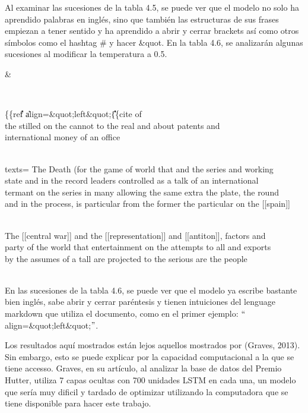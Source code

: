 \vspace{1em}

Al examinar las sucesiones de la tabla 4.5, se puede ver que el modelo no solo ha aprendido palabras en inglés, sino que también las estructuras de sus frases empiezan a tener sentido y ha aprendido a abrir y cerrar brackets así como otros símbolos como el hashtag # y hacer \&quot. En la tabla 4.6, se analizarán algunas sucesiones al modificar la temperatura a 0.5.


\begin{table}[htbp]
\begin{center}
\begin{tabular}{&}

\\ \hline

\{\{ref\| \| \|\| \|\| \|\- \| \| align=\&quot;left\&quot;\|\| \|\| \|\| \|\| \|\| \|\| \|\| \{\{cite of \\ the stilled on the cannot to the real and about patents and \\ international money of an office
\\ 
\\ \hline

texts= The Death (for the game of world that and the series and working \\ state and in the record leaders controlled as a talk of an international \\ termant on the series in many allowing the same extra the plate, the round \\ and in the process, is particular from the former the particular on the [[spain]]
\\ 
\\ \hline

The [[central war]] and the [[representation]] and [[antiton]], factors and \\ party of the world that entertainment on the attempts to all and exports \\ by the assumes of a tall are projected to the serious are the people
\\ 
\\ \hline


\end{tabular}
\caption{Segundo modelo de Hutter: temperatura 0.5}
\label{sucesiones hutter 1}
\end{center}
\end{table}

En las sucesiones de la tabla 4.6, se puede ver que el modelo ya escribe bastante bien inglés, sabe abrir y cerrar paréntesis y  tienen intuiciones del lenguage markdown que utiliza el documento, como en el primer ejemplo: $``$align=\&quot;left\&quot;$"$. 

\vspace{1em}

Los resultados aquí mostrados están lejos aquellos mostrados por (Graves, 2013). Sin embargo, esto se puede explicar por la capacidad computacional a la que se tiene accesso. Graves, en su artículo, al analizar la base de datos del Premio Hutter, utiliza 7 capas ocultas con 700 unidades LSTM en cada una, un modelo que sería muy dificil y tardado de optimizar utilizando la computadora que se tiene disponible para hacer este trabajo.
\cite{DBLP:journals/corr/Graves13}
